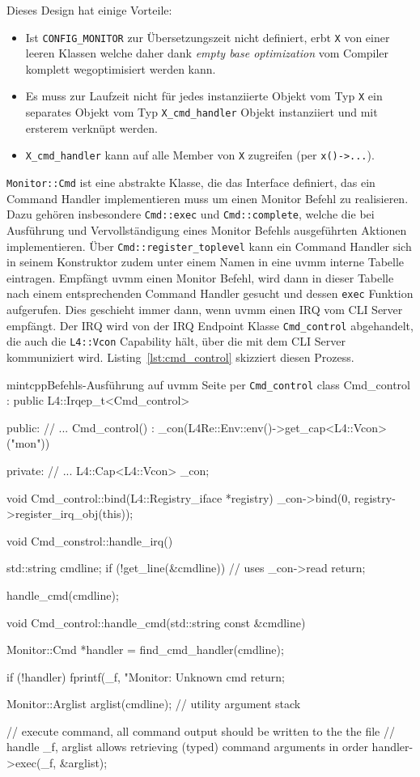 Dieses Design hat einige Vorteile:

\begin{itemize}
  \item Ist \texttt{CONFIG\_MONITOR} zur Übersetzungszeit nicht definiert,
        erbt \texttt{X} von einer leeren Klassen welche daher dank
        \textit{empty base optimization} vom Compiler komplett
        wegoptimisiert werden kann.
  \item Es muss zur Laufzeit nicht für jedes instanziierte Objekt vom Typ
        \texttt{X} ein separates Objekt vom Typ \texttt{X\_cmd\_handler}
        Objekt instanziiert und mit ersterem verknüpt werden.
  \item \texttt{X\_cmd\_handler} kann auf alle Member von \texttt{X} zugreifen
        (per \texttt{x()->...}).
\end{itemize}

\texttt{Monitor::Cmd} ist eine abstrakte Klasse, die das Interface definiert,
das ein Command Handler implementieren muss um einen Monitor Befehl zu
realisieren. Dazu gehören insbesondere \texttt{Cmd::exec} und
\texttt{Cmd::complete}, welche die bei Ausführung und Vervollständigung eines
Monitor Befehls ausgeführten Aktionen implementieren.  Über
\texttt{Cmd::register\_toplevel} kann ein Command Handler sich in seinem
Konstruktor zudem unter einem Namen in eine uvmm interne Tabelle eintragen.
Empfängt uvmm einen Monitor Befehl, wird dann in dieser Tabelle nach einem
entsprechenden Command Handler gesucht und dessen \texttt{exec} Funktion
aufgerufen.  Dies geschieht immer dann, wenn uvmm einen IRQ vom CLI Server
empfängt. Der IRQ wird von der IRQ Endpoint Klasse \texttt{Cmd\_control}
abgehandelt, die auch die \texttt{L4::Vcon} Capability hält, über die mit dem
CLI Server kommuniziert wird. Listing~\ref{lst:cmd_control} skizziert diesen
Prozess.

\begin{mintlisting}[label=lst:cmd_control]{mintcpp}{Befehls-Ausführung auf uvmm Seite per \texttt{Cmd\_control}}
class Cmd_control : public L4::Irqep_t<Cmd_control>
{
public:
  // ...
  Cmd_control()
  : _con(L4Re::Env::env()->get_cap<L4::Vcon>("mon"))
  {}

private:
  // ...
  L4::Cap<L4::Vcon> _con;
}

void Cmd_control::bind(L4::Registry_iface *registry)
{ _con->bind(0, registry->register_irq_obj(this)); }

void Cmd_constrol::handle_irq()
{
  std::string cmdline;
  if (!get_line(&cmdline)) // uses _con->read
    return;

  handle_cmd(cmdline);
}

void Cmd_control::handle_cmd(std::string const &cmdline)
{
  Monitor::Cmd *handler = find_cmd_handler(cmdline);

  if (!handler) {
    fprintf(_f, "Monitor: Unknown cmd %
    return;
  }

  Monitor::Arglist arglist(cmdline); // utility argument stack

  // execute command, all command output should be written to the the file
  // handle _f, arglist allows retrieving (typed) command arguments in order
  handler->exec(_f, &arglist);
}
\end{mintlisting}

